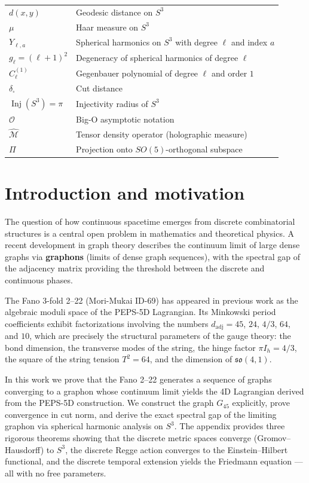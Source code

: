 \documentclass[12pt]{article}
\numberwithin{equation}{section}
\begin{document}
\begin{longtable}{p{} p{}}
\(d(x,y)\) & Geodesic distance on \(S^3\) \\
\(\mu\) & Haar measure on \(S^3\) \\
\(Y_{\ell,a}\) & Spherical harmonics on \(S^3\) with degree \(\ell\) and index \(a\) \\
\(g_\ell = (\ell+1)^2\) & Degeneracy of spherical harmonics of degree \(\ell\) \\
\(C_\ell^{(1)}\) & Gegenbauer polynomial of degree \(\ell\) and order \(1\) \\
\(\delta_{\square}\) & Cut distance \\
\(\operatorname{Inj}(S^3) = \pi\) & Injectivity radius of \(S^3\) \\
\(\mathcal{O}\) & Big-O asymptotic notation \\
\(\widehat{\mathcal{M}}\) & Tensor density operator (holographic measure) \\
\(\Pi\) & Projection onto \(SO(5)\)-orthogonal subspace \\
\hline
\end{longtable}

\section{Introduction and motivation}

The question of how continuous spacetime emerges from discrete combinatorial structures is a central open problem in mathematics and theoretical physics. A recent development in graph theory \cite{lovasz2012graphons} describes the continuum limit of large dense graphs via \textbf{graphons} (limits of dense graph sequences), with the spectral gap of the adjacency matrix providing the threshold between the discrete and continuous phases.

The Fano 3-fold 2--22 (Mori-Mukai ID-69) has appeared in previous work \cite{blandino2026fano} as the algebraic moduli space of the PEPS-5D Lagrangian. Its Minkowski period coefficients exhibit factorizations involving the numbers \(d_{\text{adj}} = 45\), \(24\), \(4/3\), \(64\), and \(10\), which are precisely the structural parameters of the gauge theory: the bond dimension, the transverse modes of the string, the hinge factor \(\pi I_h = 4/3\), the square of the string tension \(T^2 = 64\), and the dimension of \(\mathfrak{so}(4,1)\).

In this work we prove that the Fano 2--22 generates a sequence of graphs converging to a graphon whose continuum limit yields the 4D Lagrangian derived from the PEPS-5D construction. We construct the graph \(G_{45}\) explicitly, prove convergence in cut norm, and derive the exact spectral gap of the limiting graphon via spherical harmonic analysis on \(S^3\). The appendix provides three rigorous theorems showing that the discrete metric spaces converge (Gromov–Hausdorff) to \(S^3\), the discrete Regge action converges to the Einstein–Hilbert functional, and the discrete temporal extension yields the Friedmann equation — all with no free parameters.
\end{document}
